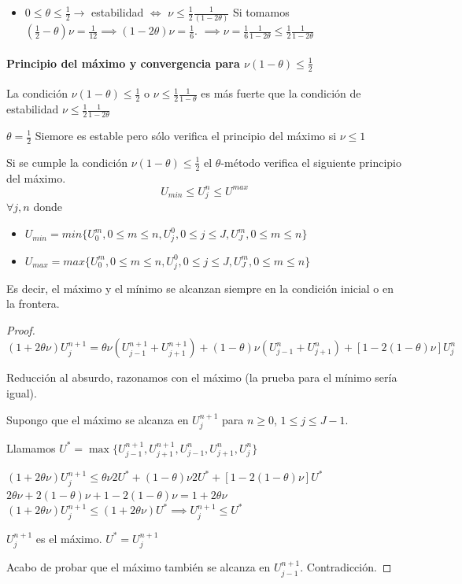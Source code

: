 \begin{itemize}
	\item $0\le\theta\le\frac{1}{2} \to$ estabilidad $\iff$ $\nu\le\frac{1}{2}\frac{1}{(1-2\theta)}$
	Si tomamos $(\frac{1}{2}-\theta)\nu = \frac{1}{12} \implies (1-2\theta)\nu=\frac{1}{6}$.
	$\implies \nu=\frac{1}{6}\frac{1}{1-2\theta}\le\frac{1}{2}\frac{1}{1-2\theta}$
\end{itemize}

\paragraph{Principio del máximo y convergencia para $\nu(1-\theta) \le \frac{1}{2}$}

\begin{obs}
	La condición $\nu(1-\theta)\le\frac{1}{2}$ o $\nu\le\frac{1}{2}\frac{1}{1-\theta}$
	es más fuerte que la condición de estabilidad $\nu\le\frac{1}{2}\frac{1}{1-2\theta}$
\end{obs}

\begin{example}
	$\theta = \frac{1}{2}$ Siemore es estable pero sólo verifica el principio del máximo si $\nu\le 1$
\end{example}

\begin{theorem}
	Si se cumple la condición $\nu(1-\theta)\le\frac{1}{2}$ el $\theta$-método verifica el siguiente principio del máximo.
	$$U_{min} \le U_j^n\le U^{max}$$
	$\forall j,n$ donde 
	\begin{itemize}
		\item $U_{min} = min\{U_0^m, 0\le m\le n, U_j^0, 0 \le j \le J, U_J^m, 0 \le m \le n \}$
		\item $U_{max} = max\{U_0^m, 0\le m\le n, U_j^0, 0 \le j \le J, U_J^m, 0 \le m \le n \}$
	\end{itemize}
	
	Es decir, el máximo y el mínimo se alcanzan siempre en la condición inicial o en la frontera.
\end{theorem}
\begin{proof}
	$(1+2\theta\nu)U_j^{n+1} = \theta\nu(U_{j-1}^{n+1}+U_{j+1}^{n+1}) + (1-\theta)\nu(U_{j-1}^{n}+U_{j+1}^{n})+
	[1-2(1-\theta)\nu]U_{j}^{n}$
	
	Reducción al absurdo, razonamos con el máximo (la prueba para el mínimo sería igual).
	
	Supongo que el máximo se alcanza en $U_j^{n+1}$ para $n\ge 0$, $1\le j \le J-1$.
	
	Llamamos $U^\ast = \max\{ U_{j-1}^{n+1},U_{j+1}^{n+1},U_{j-1}^{n},U_{j+1}^{n},U_{j}^{n} \}$
	
	$(1+2\theta\nu)U_{j}^{n+1} \le \theta\nu 2U^\ast + (1-\theta)\nu 2U^\ast + [1-2(1-\theta)\nu]U^\ast$
	$2\theta\nu + 2(1-\theta) \nu + 1-2(1-\theta)\nu = 1+2\theta\nu$
	$(1+2\theta\nu)U_{j}^{n+1} \le(1+2\theta\nu)U^\ast \implies U_{j}^{n+1} \le U^\ast$
	
	$U_{j}^{n+1}$ es el máximo.
	$U^\ast = U_{j}^{n+1}$
	
	Acabo de probar que el máximo también se alcanza en $U_{j-1}^{n+1}$.
	Contradicción.
\end{proof}